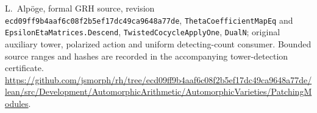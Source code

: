 L.~Alp\"oge, formal GRH source, revision
\texttt{ecd09ff9b4aaf6c08f2b5ef17dc49ca9648a77de},
\texttt{ThetaCoefficientMapEq} and
\texttt{EpsilonEtaMatrices.Descend}, \texttt{TwistedCocycleApplyOne},
\texttt{DualN}; original auxiliary tower, polarized action and uniform
detecting-count consumer. Bounded source ranges and hashes are recorded
in the accompanying tower-detection certificate.
\url{https://github.com/jsmorph/rh/tree/ecd09ff9b4aaf6c08f2b5ef17dc49ca9648a77de/lean/src/Development/AutomorphicArithmetic/AutomorphicVarieties/PatchingModules}.

